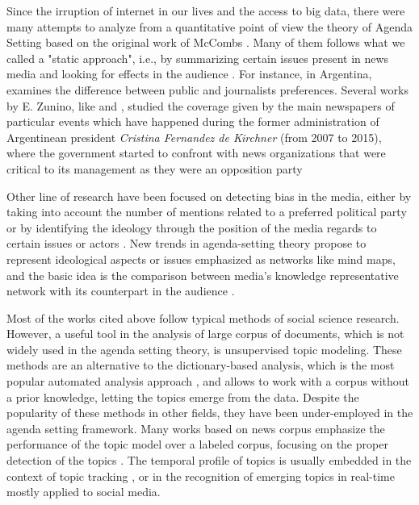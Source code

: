 \documentclass[a4paper, 12pt]{article}
\begin{document}
\par Since the irruption of internet in our lives and the access to big data, there were many attempts to analyze from a quantitative point of view the theory of Agenda Setting based on  the original work of McCombs \cite{mccombs1972agenda}. Many of them follows what we called a "static approach", i.e., by summarizing certain issues present in news media and looking for effects in the audience \cite{brians1996campaign, gerber2009does, coleman2007young}.
For instance, in Argentina, \cite{mitchelstein2016brecha} examines the difference between public and journalists preferences. 
Several works by E. Zunino, like \cite{zunino2010cobertura} and \cite{koziner2013cobertura}, studied the coverage given by the main newspapers of particular events which have happened during the former administration of Argentinean president \emph{Cristina Fernandez de Kirchner} (from 2007 to 2015), where the government started to confront with news organizations that were critical to its management as they were an opposition party \cite{mitchelstein2017information}

\par Other line of research have been focused on detecting bias in the media, either by taking into account the number of mentions related  to a preferred political party \cite{lazaridou2016identifying, baumgartner2015all} or by identifying the ideology through the position of the media regards to certain issues or actors \cite{elejalde2018nature, sagarzazu2017hugo}. New trends in agenda-setting theory propose to represent ideological aspects or issues emphasized as networks like mind maps, and the basic idea is the comparison between media's knowledge representative network with its counterpart in the audience \cite{guo2012application}\cite{vu2014exploring}.


\par Most of the works cited above follow typical methods of social science research. However, a useful tool in the analysis of large corpus of documents, which is not widely used in the agenda setting theory, is unsupervised topic modeling. These methods are an alternative to the dictionary-based analysis, which is the most popular automated analysis approach \cite{guo2016big}, and allows to work with a corpus without a prior knowledge, letting the topics emerge from the data. Despite the popularity of these methods in other fields, they have been under-employed in the agenda setting framework.
Many works based on news corpus emphasize the performance of the topic model over a labeled corpus, focusing on the proper detection of the topics \cite{dai2010online, po2016topic, brun2000experiment}. The temporal profile of topics is usually embedded in the context of topic tracking \cite{hu2016news, li2017joint}, or in the recognition of emerging topics in real-time \cite{cataldi2010emerging} mostly applied to social media. 
\end{document}
